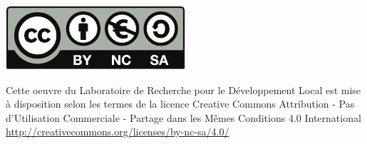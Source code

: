 \documentclass[11pt,a4paper]{scrartcl}
\begin{document}
\newpage

\vspace*{\fill}

\begin{center}
\includegraphics{by-nc-sa_eu.pdf}

Cette oeuvre du Laboratoire de Recherche pour le Développement Local est mise à disposition selon les termes de la licence Creative Commons Attribution - Pas d’Utilisation Commerciale - Partage dans les Mêmes Conditions 4.0 International\\\url{http://creativecommons.org/licenses/by-nc-sa/4.0/}
\end{center}

\vspace*{\fill}
\end{document}
